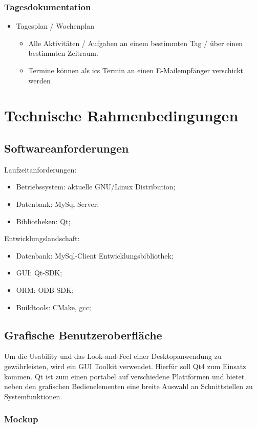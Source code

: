 \documentclass[a4paper,10pt]{article}
\begin{document}
\subsubsection{Tagesdokumentation}
\begin{itemize}
	\item Tagesplan / Wochenplan
	\begin{itemize}
		\item Alle Aktivitäten / Aufgaben an einem bestimmten Tag / über einen bestimmten Zeitraum.
		\item Termine können als ics Termin an einen E-Mailempfänger verschickt werden
	\end{itemize}
\end{itemize}

\section{Technische Rahmenbedingungen}

\subsection{Softwareanforderungen}
Laufzeitanforderungen:
\begin{itemize}
 \item Betriebssystem: aktuelle GNU/Linux Distribution;
 \item Datenbank: MySql Server;
 \item Bibliotheken: Qt;
\end{itemize}
Entwicklungslandschaft:
\begin{itemize}
 \item Datenbank: MySql-Client Entwicklungsbibliothek;
 \item GUI: Qt-SDK; 
 \item ORM: ODB-SDK;
 \item Buildtools: CMake,  gcc;
\end{itemize}

\subsection{Grafische Benutzeroberfläche}
Um die Usability und das Look-and-Feel einer Desktopanwendung zu gewährleisten, wird ein GUI Toolkit verwendet.
Hierfür soll Qt4 zum Einsatz kommen. Qt ist zum einen portabel auf verschiedene Plattformen und bietet neben den grafischen Bedienelementen eine breite Auswahl an Schnittstellen zu Systemfunktionen.
\subsubsection{Mockup}
\end{document}
